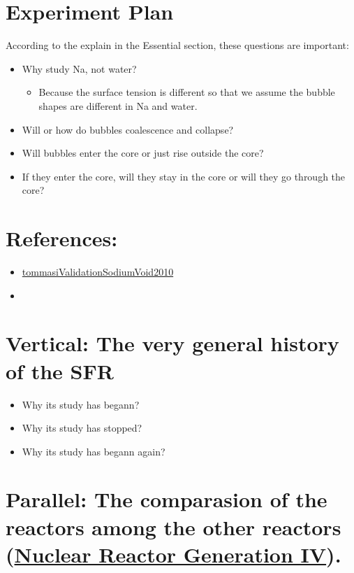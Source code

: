 \documentclass[11pt]{article}
\begin{document}
\section{Experiment Plan}
\label{sec:org14dc6f6}
According to the explain in the Essential section, these questions are important:

\begin{itemize}
\item Why study Na, not water?
\begin{itemize}
\item Because the surface tension is different so that we assume the bubble shapes are different in Na and water.
\end{itemize}
\item Will or how do bubbles coalescence and collapse?
\item Will bubbles enter the core or just rise outside the core?
\item If they enter the core, will they stay in the core or will they go through the core?
\end{itemize}

\section{References:}
\label{sec:org2f8bbfb}
\begin{itemize}
\item \href{20240227161920-validation_of_the_sodium_void_reactivity_effect_prediction_using_jeff_3_1_nuclear_data.org}{tommasiValidationSodiumVoid2010}
\item 
\end{itemize}
\section{Vertical: The very general history of the SFR}
\label{sec:org42a1e9e}
\begin{itemize}
\item Why its study has begann?
\item Why its study has stopped?
\item Why its study has begann again?
\end{itemize}
\section{Parallel: The comparasion of the reactors among the other reactors (\href{20240131150544-nuclear_reactor_generation_iv.org}{Nuclear Reactor Generation IV}).}
\label{sec:org4e54d51}
\end{document}
